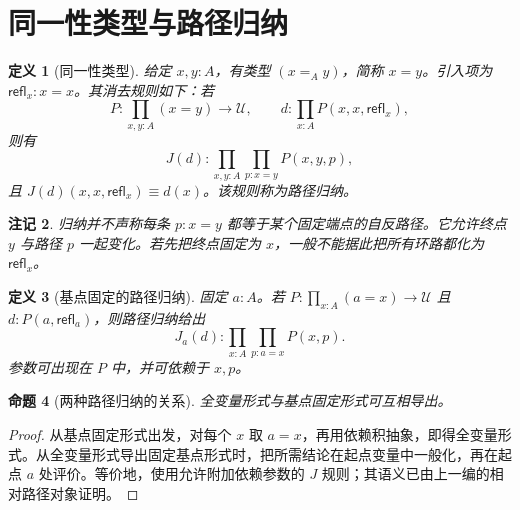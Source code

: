\documentclass[12pt,oneside,openany,fontset=none]{ctexbook}
\theoremstyle{cn}
\newtheorem{definition}{定义}[chapter]
\newtheorem{proposition}[definition]{命题}
\newtheorem{remark}[definition]{注记}
\numberwithin{equation}{chapter}
\newcommand{\U}{\mathcal U}
\newcommand{\refl}{\mathsf{refl}}
\begin{document}
\section{同一性类型与路径归纳}
\begin{definition}[同一性类型]
给定 $x,y:A$，有类型 $(x=_Ay)$，简称 $x=y$。引入项为 $\refl_x:x=x$。其消去规则如下：若
\[
P:\prod_{x,y:A}(x=y)\to\U,
\qquad d:\prod_{x:A}P(x,x,\refl_x),
\]
则有
\[
J(d):\prod_{x,y:A}\prod_{p:x=y}P(x,y,p),
\]
且 $J(d)(x,x,\refl_x)\equiv d(x)$。该规则称为路径归纳。
\end{definition}
\begin{remark}
归纳并不声称每条 $p:x=y$ 都等于某个固定端点的自反路径。它允许终点 $y$ 与路径 $p$ 一起变化。若先把终点固定为 $x$，一般不能据此把所有环路都化为 $\refl_x$。
\end{remark}
\begin{definition}[基点固定的路径归纳]
固定 $a:A$。若 $P:\prod_{x:A}(a=x)\to\U$ 且 $d:P(a,\refl_a)$，则路径归纳给出
\[
J_a(d):\prod_{x:A}\prod_{p:a=x}P(x,p).
\]
参数可出现在 $P$ 中，并可依赖于 $x,p$。
\end{definition}
\begin{proposition}[两种路径归纳的关系]
全变量形式与基点固定形式可互相导出。
\end{proposition}
\begin{proof}
从基点固定形式出发，对每个 $x$ 取 $a=x$，再用依赖积抽象，即得全变量形式。从全变量形式导出固定基点形式时，把所需结论在起点变量中一般化，再在起点 $a$ 处评价。等价地，使用允许附加依赖参数的 $J$ 规则；其语义已由上一编的相对路径对象证明。
\end{proof}
\end{document}
